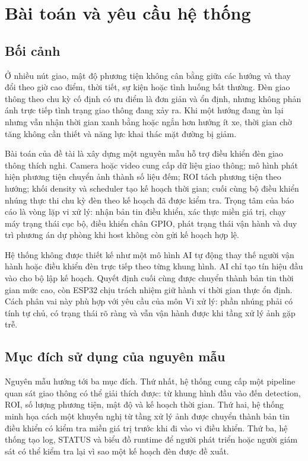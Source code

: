 \section{Bài toán và yêu cầu hệ thống}

\subsection{Bối cảnh}

Ở nhiều nút giao, mật độ phương tiện không cân bằng giữa các hướng và thay đổi theo giờ cao điểm, thời tiết, sự kiện hoặc tình huống bất thường. Đèn giao thông theo chu kỳ cố định có ưu điểm là đơn giản và ổn định, nhưng không phản ánh trực tiếp tình trạng giao thông đang xảy ra. Khi một hướng đang ùn lại nhưng vẫn nhận thời gian xanh bằng hoặc ngắn hơn hướng ít xe, thời gian chờ tăng không cần thiết và năng lực khai thác mặt đường bị giảm.

Bài toán của đề tài là xây dựng một nguyên mẫu hỗ trợ điều khiển đèn giao thông thích nghi. Camera hoặc video cung cấp dữ liệu giao thông; mô hình phát hiện phương tiện chuyển ảnh thành số liệu đếm; ROI tách phương tiện theo hướng; khối density và scheduler tạo kế hoạch thời gian; cuối cùng bộ điều khiển nhúng thực thi chu kỳ đèn theo kế hoạch đã được kiểm tra. Trọng tâm của báo cáo là vòng lặp vi xử lý: nhận bản tin điều khiển, xác thực miền giá trị, chạy máy trạng thái cục bộ, điều khiển chân GPIO, phát trạng thái vận hành và duy trì phương án dự phòng khi host không còn gửi kế hoạch hợp lệ.

Hệ thống không được thiết kế như một mô hình AI tự động thay thế người vận hành hoặc điều khiển đèn trực tiếp theo từng khung hình. AI chỉ tạo tín hiệu đầu vào cho bộ lập kế hoạch. Quyết định cuối cùng được chuyển thành bản tin thời gian mức cao, còn ESP32 chịu trách nhiệm giữ hành vi thời gian thực ổn định. Cách phân vai này phù hợp với yêu cầu của môn Vi xử lý: phần nhúng phải có tính tự chủ, có trạng thái rõ ràng và vẫn vận hành được khi tầng xử lý ảnh gặp trễ.

\subsection{Mục đích sử dụng của nguyên mẫu}

Nguyên mẫu \projectname{} hướng tới ba mục đích. Thứ nhất, hệ thống cung cấp một pipeline quan sát giao thông có thể giải thích được: từ khung hình đầu vào đến detection, ROI, số lượng phương tiện, mật độ và kế hoạch thời gian. Thứ hai, hệ thống minh họa cách một khuyến nghị từ tầng xử lý ảnh được chuyển thành bản tin điều khiển có kiểm tra miền giá trị trước khi đi vào vi điều khiển. Thứ ba, hệ thống tạo log, STATUS và biểu đồ runtime để người phát triển hoặc người giám sát có thể kiểm tra lại vì sao một kế hoạch đèn được đề xuất.

